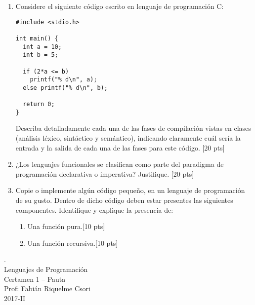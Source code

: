 \documentclass[letter,12pt,oneside]{book}
\theoremstyle{definition}
\begin{document}
\begin{enumerate}
    \item Considere el siguiente código escrito en lenguaje de programación C:
    
    \begin{lstlisting}[style=CStyle]
#include <stdio.h>

int main() {
  int a = 10;
  int b = 5;
  
  if (2*a <= b)
    printf("% d\n", a);
  else printf("% d\n", b);
  
  return 0;
}
\end{lstlisting}
Describa detalladamente cada una de las fases de compilación vistas en clases (análisis léxico, sintáctico y semántico), indicando claramente cuál sería la entrada y la salida de cada una de las fases para este código. \tabto{80ex}[20 pts]
    
\item ¿Los lenguajes funcionales se clasifican como parte del paradigma de programación declarativa o imperativa? Justifique. \tabto{80ex}[20 pts]

\item Copie o implemente algún código pequeño, en un lenguaje de programación de su gusto. Dentro de dicho código deben estar presentes las siguientes componentes. Identifique y explique la presencia de:
    \begin{enumerate}
    \item Una función pura.\tabto{75ex}[10 pts]
    \item Una función recursiva.\tabto{75ex}[10 pts]
    \end{enumerate}
\end{enumerate}

\newpage

\begin{center}
 {\Large
  {\color{white}.}\\[5ex]
  Lenguajes de Programación\\[1ex]
  Certamen 1 -- Pauta}\\[1.2ex]
  Prof: Fabián Riquelme Csori\\
  2017-II
\end{center}
\end{document}
